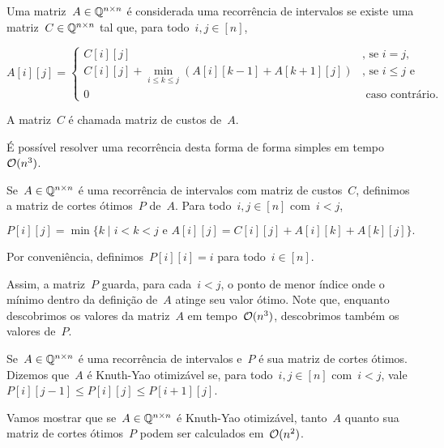 \begin{defi}
Uma matriz~$A \in \mathbb{Q}^{n \times n}$ é considerada uma recorrência de intervalos se existe uma matriz~$C \in \mathbb{Q}^{n \times n}$ tal que, para todo~$i,j \in [n]$,

\begin{equation*}
A[i][j] = \begin{cases}
C[i][j]                                                           & \text{, se } i = j \text{, }  \\
C[i][j] + \min\limits_{i \leq k \leq j}(A[i][k-1] + A[k+1][j])    & \text{, se } i \leq j \text{ e } \\
0                                                                 & \text{ caso contrário. }
\end{cases}
\end{equation*}

A matriz~$C$ é chamada matriz de custos de~$A$.
\end{defi}

É possível resolver uma recorrência desta forma de forma simples em tempo~$\mathcal{O}(n^3)$. 

\begin{defi}
Se~$A \in \mathbb{Q}^{n \times n}$ é uma recorrência de intervalos com matriz de custos~$C$, definimos a matriz de cortes ótimos~$P$ de~$A$. Para todo~$i,j \in [n]$ com~$i < j$, 

$$P[i][j] = \min\{k \mid i < k < j \text{ e } A[i][j] = C[i][j] + A[i][k] + A[k][j]\} \text{.}$$

Por conveniência, definimos~$P[i][i] = i$ para todo~$i \in [n]$.
\end{defi}

Assim, a matriz~$P$ guarda, para cada~$i < j$, o ponto de menor índice onde o mínimo dentro da definição de~$A$ atinge seu valor ótimo. Note que, enquanto descobrimos os valores da matriz~$A$ em tempo~$\mathcal{O}(n^3)$, descobrimos também os valores de~$P$.

\begin{defi}
Se~$A \in \mathbb{Q}^{n \times n}$ é uma recorrência de intervalos e~$P$ é sua matriz de cortes ótimos. Dizemos que~$A$ é Knuth-Yao otimizável se, para todo~$i,j \in [n]$ com~$i < j$, vale~${P[i][j-1] \leq P[i][j] \leq P[i+1][j]}$.
\end{defi}

Vamos mostrar que se~$A \in \mathbb{Q}^{n \times n}$ é Knuth-Yao otimizável, tanto~$A$ quanto sua matriz de cortes ótimos~$P$ podem ser calculados em~$\mathcal{O}(n^2)$.

